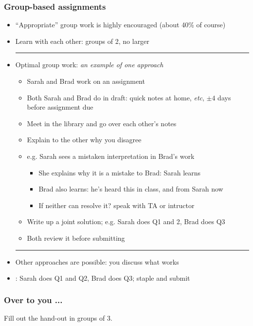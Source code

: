 \begin{frame}\frametitle{Group-based assignments}
	\begin{itemize}
		\item	``Appropriate'' group work is highly encouraged (about 40\% of course)
		\item	Learn with each other: groups of 2, no larger
		\hrule
		\item	Optimal group work: \emph{an example of one approach}
			\begin{itemize}
				\item	Sarah and Brad work on an assignment
				\item	Both Sarah and Brad do {} in draft: quick notes at home, \emph{etc}, $\pm 4$ days before assignment due
				\item	Meet in the library and go over each other's notes
				\item	Explain to the other why you disagree
				\item	e.g. Sarah sees a mistaken interpretation in Brad's work
				\begin{itemize}
					\item	She explains why it is a mistake to Brad: Sarah learns
					\item	Brad also learns: he's heard this in class, and from Sarah now
					\item	If neither can resolve it? speak with TA or intructor					
				\end{itemize}
				\item	Write up a joint solution; e.g. Sarah does Q1 and 2, Brad does Q3
				\item	Both review it before submitting
			\end{itemize}
		\hrule
		\item	Other approaches are possible: you discuss what works
		\item	\color{myOrange}{What doesn't work}: Sarah does Q1 and Q2, Brad does Q3; staple and submit
	\end{itemize}
\end{frame}

\begin{frame}\frametitle{Over to you ...}
	Fill out the hand-out in groups of 3.
\end{frame}